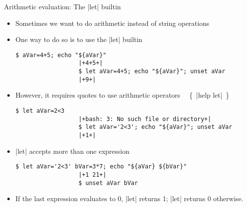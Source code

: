 \begin{frame}[fragile]{Arithmetic evaluation: The \bash|let| builtin}
    \vspace{-4mm}
    \begin{itemize}
        \item Sometimes we want to do arithmetic instead of string operations
        \item One way to do so is to use the \bash|let| builtin
              \begin{lstlisting}[style=MyBash, style=oddnumbers, aboveskip=2mm, belowskip=-6mm]
                  $ aVar=4+5; echo "${aVar}"
                  |+4+5+|
                  $ let aVar=4+5; echo "${aVar}"; unset aVar
                  |+9+|
              \end{lstlisting}
        \item However, it requires quotes to use arithmetic operators $\quad${\tiny\{~\bash|help let|~\}}
              \begin{lstlisting}[style=MyBash, style=oddnumbers, aboveskip=2mm, belowskip=-6mm, firstnumber=4]
                  $ let aVar=2<3
                  |+bash: 3: No such file or directory+|
                  $ let aVar='2<3'; echo "${aVar}"; unset aVar
                  |+1+|
              \end{lstlisting}
        \item \bash|let| accepts more than one expression
              \begin{lstlisting}[style=MyBash, style=oddnumbers, aboveskip=2mm, belowskip=-6mm, firstnumber=8]
                  $ let aVar='2<3' bVar=3*7; echo "${aVar} ${bVar}"
                  |+1 21+|
                  $ unset aVar bVar
              \end{lstlisting}
        \item If the last expression evaluates to 0, \bash|let| returns 1; \bash|let| returns 0 otherwise.
    \end{itemize}
\end{frame}
